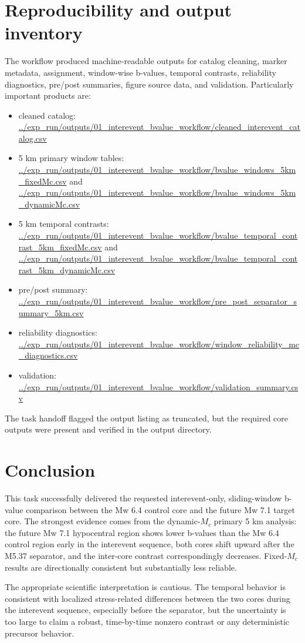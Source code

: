\documentclass[11pt]{article}
\begin{document}
\section{Reproducibility and output inventory}
The workflow produced machine-readable outputs for catalog cleaning, marker metadata, assignment, window-wise b-values, temporal contrasts, reliability diagnostics, pre/post summaries, figure source data, and validation. Particularly important products are:
\begin{itemize}[leftmargin=1.5em]
    \item cleaned catalog: \url{../exp_run/outputs/01_interevent_bvalue_workflow/cleaned_interevent_catalog.csv}
    \item 5 km primary window tables: \url{../exp_run/outputs/01_interevent_bvalue_workflow/bvalue_windows_5km_fixedMc.csv} and \url{../exp_run/outputs/01_interevent_bvalue_workflow/bvalue_windows_5km_dynamicMc.csv}
    \item 5 km temporal contrasts: \url{../exp_run/outputs/01_interevent_bvalue_workflow/bvalue_temporal_contrast_5km_fixedMc.csv} and \url{../exp_run/outputs/01_interevent_bvalue_workflow/bvalue_temporal_contrast_5km_dynamicMc.csv}
    \item pre/post summary: \url{../exp_run/outputs/01_interevent_bvalue_workflow/pre_post_separator_summary_5km.csv}
    \item reliability diagnostics: \url{../exp_run/outputs/01_interevent_bvalue_workflow/window_reliability_mc_diagnostics.csv}
    \item validation: \url{../exp_run/outputs/01_interevent_bvalue_workflow/validation_summary.csv}
\end{itemize}
The task handoff flagged the output listing as truncated, but the required core outputs were present and verified in the output directory.

\section{Conclusion}
This task successfully delivered the requested interevent-only, sliding-window b-value comparison between the Mw 6.4 control core and the future Mw 7.1 target core. The strongest evidence comes from the dynamic-$M_c$ primary 5 km analysis: the future Mw 7.1 hypocentral region shows lower b-values than the Mw 6.4 control region early in the interevent sequence, both cores shift upward after the M5.37 separator, and the inter-core contrast correspondingly decreases. Fixed-$M_c$ results are directionally consistent but substantially less reliable.

The appropriate scientific interpretation is cautious. The temporal behavior is consistent with localized stress-related differences between the two cores during the interevent sequence, especially before the separator, but the uncertainty is too large to claim a robust, time-by-time nonzero contrast or any deterministic precursor behavior.
\end{document}
